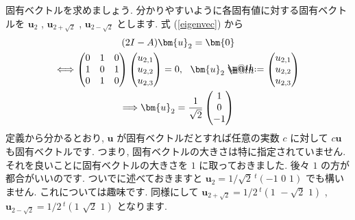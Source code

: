 \documentclass[openany, a4paper, oneside]{jsbook}
\makeatletter
\newcommand*{\defeq}{\mathrel{\rlap{%
\raisebox{0.3ex}{$\m@th\cdot$}}%
\raisebox{-0.3ex}{$\m@th\cdot$}}%
=}
\theoremstyle{break}
\theoremstyle{breakdefn}
\makeatother
\begin{document}
固有ベクトルを求めましょう. 分かりやすいように各固有値に対する固有ベクトルを
 $\bm{u}_{2}$ ,  $\bm{u}_{2 + \sqrt{2}}$ ,  $\bm{u}_{2 - \sqrt{2}}$ とします.
式 (\ref{eigenvec}) から
    \begin{gather}
        (2 I - A )\bm{u}_{2} = \bm{0} \\
        \Longleftrightarrow
        \begin{pmatrix} 0 & 1 & 0 \\
                        1 & 0 & 1 \\
                        0 & 1 & 0
        \end{pmatrix}
        \begin{pmatrix} u_{2,1} \\ u_{2,2} \\ u_{2,3} \end{pmatrix}
        = 0 ,\,\,\,\, \bm{u}_{2} \defeq \begin{pmatrix} u_{2,1} \\ u_{2,2} \\ u_{2,3} \end{pmatrix} \\
        \Longrightarrow
        \bm{u}_{2}
        =
        \frac{1}{\sqrt{2}} \begin{pmatrix} 1 \\ 0 \\ -1 \end{pmatrix}
    \end{gather}
定義から分かるとおり,  $\bm{u}$ が固有ベクトルだとすれば任意の実数 $c$ に対して $c \bm{u}$ も固有ベクトルです.
つまり, 固有ベクトルの大きさは特に指定されていません. それを良いことに固有ベクトルの大きさを $1$ に取っておきました.
後々 $1$ の方が都合がいいのです. ついでに述べておきますと $\bm{u}_{2} = 1/\sqrt{2} \, ^{t}( -1 \,\, 0 \,\, 1)$ でも構いません.
これについては趣味です. 同様にして $\bm{u}_{2 + \sqrt{2}} = 1/2 \, ^{t}(1 \,\, -\sqrt{2} \,\, 1)$ ,
 $\bm{u}_{2 - \sqrt{2}} = 1/2 \, ^{t}(1 \,\, \sqrt{2} \,\, 1)$ となります.
\end{document}
